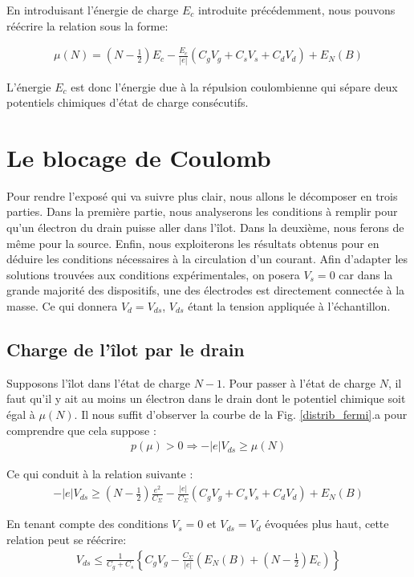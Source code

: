 En introduisant l'énergie de charge $E_c$ introduite précédemment, nous pouvons réécrire la relation sous la forme:

\begin{eqnarray}
\mu(N) = (N-\frac{1}{2})E_c
- 
\frac{E_c}{|e|}(C_gV_g + C_sV_s + C_dV_d)
+
E_N(B)
\label{pot_chim}
\end{eqnarray}

L'énergie $E_c$ est donc l'énergie due à la répulsion coulombienne qui sépare deux potentiels chimiques d'état de charge consécutifs.


\section{Le blocage de Coulomb}
Pour rendre l'exposé qui va suivre plus clair, nous allons le décomposer en trois parties. Dans la première partie, nous analyserons les conditions à remplir pour qu'un électron du drain puisse aller dans l'\^ilot. Dans la deuxième, nous ferons de m\^eme pour la source. Enfin, nous exploiterons les résultats obtenus pour en déduire les conditions nécessaires à la circulation d'un courant. Afin d'adapter les solutions trouvées aux conditions expérimentales, on posera $V_s = 0$ car dans la grande majorité des dispositifs, une des électrodes est directement connectée à la masse. Ce qui donnera $V_d=V_{ds}$, $V_{ds}$ étant la tension appliquée à l'échantillon.

\subsection{Charge de l'\^ilot par le drain}
Supposons l'\^ilot dans l'état de charge $N-1$. Pour passer à l'état de charge $N$, il faut qu'il y ait au moins un électron dans le drain dont le potentiel chimique soit égal à $\mu(N)$. Il nous suffit d'observer la courbe de la Fig. \ref{distrib_fermi}.a pour comprendre que cela suppose :
\begin{eqnarray}
p(\mu) > 0 \Longrightarrow  -|e|V_{ds} \geq \mu(N) \nonumber
\end{eqnarray}

Ce qui conduit à la relation suivante :
\begin{eqnarray}
-|e|V_{ds} \geq (N-\frac{1}{2})\frac{e^2}{C_{\Sigma}}
-
\frac{|e|}{C_{\Sigma}}(C_gV_g + C_sV_s + C_dV_d)
+
E_N(B) \nonumber
\end{eqnarray}

En tenant compte des conditions $V_s= 0$ et $V_{ds} = V_d$ évoquées plus haut, cette relation peut se réécrire:
\begin{eqnarray}
V_{ds} \leq \frac{1}{C_g + C_s} \left\lbrace C_gV_g - \frac{C_{\Sigma}}{|e|}\left(E_N(B) + (N-\frac{1}{2})E_c \right) \right\rbrace 
\end{eqnarray}

